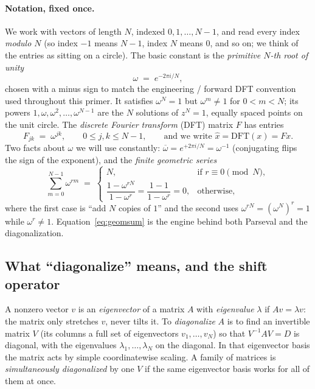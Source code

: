 \paragraph{Notation, fixed once.}
We work with vectors of length $N$, indexed $0,1,\dots,N-1$, and read every index
\emph{modulo $N$} (so index $-1$ means $N-1$, index $N$ means $0$, and so on; we think
of the entries as sitting on a circle). The basic constant is the \emph{primitive
$N$-th root of unity}
\[
  \omega \;=\; e^{-2\pi i / N},
\]
chosen with a minus sign to match the engineering / forward DFT convention used throughout this
primer. It satisfies $\omega^N = 1$ but $\omega^m \neq 1$ for $0 < m < N$; its powers
$1, \omega, \omega^2, \dots, \omega^{N-1}$ are the $N$ solutions of $z^N = 1$, equally
spaced points on the unit circle. The \emph{discrete Fourier transform} (DFT) matrix
$F$ has entries
\[
  F_{jk} \;=\; \omega^{jk}, \qquad 0 \le j,k \le N-1,
  \qquad\text{and we write } \widehat{x} = \mathrm{DFT}(x) = F x .
\]
Two facts about $\omega$ we will use constantly: $\overline{\omega} = e^{+2\pi i/N} =
\omega^{-1}$ (conjugating flips the sign of the exponent), and the \emph{finite
geometric series}
\begin{equation}
\label{eq:geomsum}
  \sum_{m=0}^{N-1} \omega^{rm} \;=\;
  \begin{cases}
    N, & \text{if } r \equiv 0 \pmod N, \\[2pt]
    \dfrac{1 - \omega^{rN}}{1 - \omega^{r}} = \dfrac{1-1}{1-\omega^r} = 0, &
    \text{otherwise,}
  \end{cases}
\end{equation}
where the first case is ``add $N$ copies of $1$'' and the second uses $\omega^{rN} =
(\omega^N)^r = 1$ while $\omega^r \neq 1$. Equation~\eqref{eq:geomsum} is the engine
behind both Parseval and the diagonalization.

\subsection{What ``diagonalize'' means, and the shift operator}

\begin{definition}
\label{def:diag}
A nonzero vector $v$ is an \emph{eigenvector} of a matrix $A$ with \emph{eigenvalue}
$\lambda$ if $A v = \lambda v$: the matrix only stretches $v$, never tilts it. To
\emph{diagonalize} $A$ is to find an invertible matrix $V$ (its columns a full set of
eigenvectors $v_1,\dots,v_N$) so that $V^{-1} A V = D$ is diagonal, with the
eigenvalues $\lambda_1,\dots,\lambda_N$ on the diagonal. In that eigenvector basis the
matrix acts by simple coordinatewise scaling. A family of matrices is
\emph{simultaneously diagonalized} by one $V$ if the same eigenvector basis works for
all of them at once.
\end{definition}

